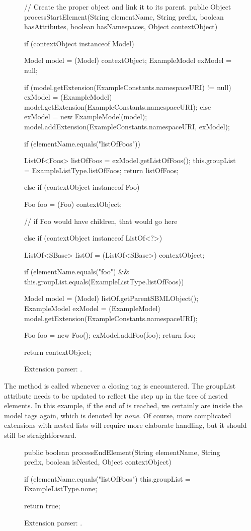 \begin{figure}[htb]
  \begin{example}[numbers=left]
// Create the proper object and link it to its parent.
public Object processStartElement(String elementName, String prefix,
    boolean hasAttributes, boolean hasNamespaces, Object contextObject) {

  if (contextObject instanceof Model) {
    Model model = (Model) contextObject;
    ExampleModel exModel = null;

    if (model.getExtension(ExampleConstants.namespaceURI) != null) {
      exModel = (ExampleModel) model.getExtension(ExampleConstants.namespaceURI);
    } else {
      exModel = new ExampleModel(model);
      model.addExtension(ExampleConstants.namespaceURI, exModel);
    }

    if (elementName.equals("listOfFoos")) {

      ListOf<Foos> listOfFoos = exModel.getListOfFoos();
      this.groupList = ExampleListType.listOfFoos;
      return listOfFoos;
    }
  } else if (contextObject instanceof Foo) {
    Foo foo = (Foo) contextObject;

    // if Foo would have children, that would go here

  }
  else if (contextObject instanceof ListOf<?>) {
    ListOf<SBase> listOf = (ListOf<SBase>) contextObject;

    if (elementName.equals("foo") && this.groupList.equals(ExampleListType.listOfFoos)) {
      Model model = (Model) listOf.getParentSBMLObject();
      ExampleModel exModel = (ExampleModel) model.getExtension(ExampleConstants.namespaceURI);

      Foo foo = new Foo();
      exModel.addFoo(foo);
      return foo;
    }
  }
  return contextObject;
}\end{example}
  \caption{Extension parser: .}
  \label{lst:ModelExtParserStartElement}
\end{figure}

The  method is called whenever a closing tag is
encountered.  The groupList attribute needs to be updated to reflect the step
up in the tree of nested elements.  In this example, if the end of
 is reached, we certainly are inside the model tags
again, which is denoted by \emph{none}.  Of course, more complicated
extensions with nested lists will require more elaborate handling, but it
should still be straightforward.

\begin{figure}[htb]
  \begin{example}[numbers=left]
public boolean processEndElement(String elementName, String prefix,
  boolean isNested, Object contextObject) {

  if (elementName.equals("listOfFoos") {
    this.groupList = ExampleListType.none;
  }

  return true;
}\end{example}
  \caption{Extension parser: .}
  \label{lst:ModelExtParserEndElement}
\end{figure}

